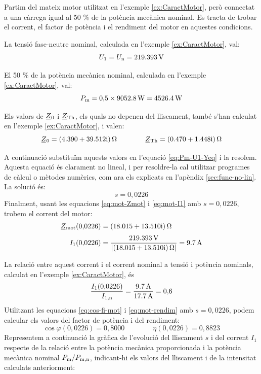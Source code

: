 \begin{exemple}\label{ex:MotCarregaReduida}
	\addcontentsxms{\MotCarregaReduida}
	Partim del mateix motor utilitzat en l'exemple \vref{ex:CaractMotor}, però connectat a una càrrega igual  al 50 \% de la potència mecànica nominal. Es tracta de trobar el corrent, el factor de potència i el rendiment del motor en aquestes condicions.

	La tensió  fase-neutre  nominal, calculada  en l'exemple \ref{ex:CaractMotor}, val: 
	\[
		U_1 = U_\mathrm{n} = \qty{219,393}{V}
	\]
	
	El 50 \% de la potència mecànica nominal, calculada  en l'exemple \ref{ex:CaractMotor}, val:
	\[
		P_\mathrm{m} =  0{,}5\times\qty{9052,8}{W} = \qty{4526,4}{W}
	\]

	Els valors de $\cmplx{Z}_0$ i  $\cmplx{Z}\ped{Th}$, els quals no depenen del lliscament, també s'han calculat en  l'exemple \ref{ex:CaractMotor}, i valen:
	\[
       \cmplx{Z}_0 =  \complexqty{4,390+j39,512}{\ohm} 
       \qquad \qquad
       \cmplx{Z}\ped{Th} = \complexqty{0,470+j1,448}{\ohm} 
	\]
	
	A continuació  substituïm aquests valors en l'equació \eqref{eq:Pm-U1-Yeq} i la resolem.  Aquesta equació és clarament no lineal, i per resoldre-la cal utilitzar programes de càlcul o mètodes numèrics, com ara els explicats en l'apèndix \ref{sec:func-no-lin}. La solució és:
	\[
		s = 0{,}0226
	\]
	Finalment, usant les equacions \eqref{eq:mot-Zmot} i \eqref{eq:mot-I1} amb $s  = 0{,}0226$,  trobem el corrent del motor:
	\begin{align*}
	\cmplx{Z}\ped{mot}(0{,}0226) &=  \complexqty{18,015+j13,510}{\ohm} \\[0.5ex]
	I_1(0{,}0226) &= \frac{\qty{219,393}{V}}{|\complexqty{18,015+j13,510}{\ohm}|} = \qty{9,7}{A}
	\end{align*}
	
	La relació entre aquest  corrent i el corrent nominal a tensió i potència nominals, calculat en l'exemple \ref{ex:CaractMotor}, és
	\[
	\frac{I_1(0{,}0226)}{I_\mathrm{1,n}} = \frac{\qty{9,7}{A}}{\qty{17,7}{A}} = 0{,}6
	\]
	Utilitzant les equacions  \eqref{eq:cos-fi-mot} i \eqref{eq:mot-rendim} amb $s  = 0{,}0226$, podem calcular els valors del factor de potència i del rendiment:
	\[
		\cos\varphi(0{,}0226) =  0{,}8000 \qquad \qquad
		\eta(0{,}0226) =  0{,}8823
	\]
	Representem a continuació la gràfica de l'evolució del lliscament $s$ i del corrent $I_1$ respecte de la relació entre la potència mecànica proporcionada i la potència mecànica nominal $P_\mathrm{m}/P_\mathrm{m,n}$, indicant-hi els valors del lliscament i de la intensitat calculats anteriorment:
	\begin{center}
		
	\end{center}


\end{exemple}
